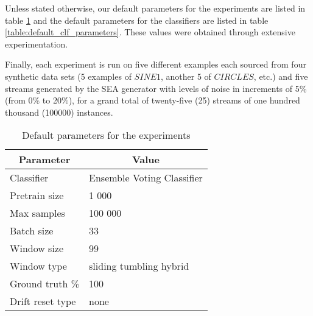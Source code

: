 Unless stated otherwise, our default parameters for the experiments are listed in table \ref{table:default_exp_parameters} and the default parameters for the classifiers are listed in table \ref{table:default_clf_parameters}. These values were obtained through extensive experimentation.

Finally, each experiment is run on five different examples each sourced from four synthetic data sets (5 examples of $SINE1$, another 5 of $CIRCLES$, etc.) and five streams generated by the SEA generator with levels of noise in increments of 5\% (from 0\% to 20\%), for a grand total of twenty-five (25) streams of one hundred thousand (100000) instances.

\begin{table}[]
\centering
\caption{\label{table:default_exp_parameters}Default parameters for the experiments}
\begin{tabular}{|l|l|}
\hline
\multicolumn{1}{|c|}{\textbf{Parameter}} & \multicolumn{1}{c|}{\textbf{Value}} \\ \hline
Classifier & Ensemble Voting Classifier \\ \hline
Pretrain size & 1 000 \\ \hline
Max samples & 100 000 \\ \hline
Batch size & 33 \\ \hline
Window size & 99 \\ \hline
Window type & sliding tumbling hybrid \\ \hline
Ground truth \% & 100 \\ \hline
Drift reset type & none \\ \hline
\end{tabular}
\end{table}

